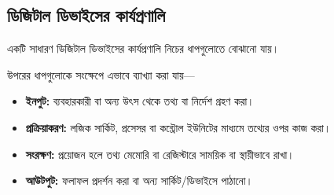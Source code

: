 \subsection{ডিজিটাল ডিভাইসের কার্যপ্রণালি}

একটি সাধারণ ডিজিটাল ডিভাইসের কার্যপ্রণালি নিচের ধাপগুলোতে বোঝানো যায়।

\begin{center}
\begin{chThreeDiagram}
\end{chThreeDiagram}
\end{center}

\smallskip

উপরের ধাপগুলোকে সংক্ষেপে এভাবে ব্যাখ্যা করা যায়—

\begin{itemize}[label={{\bulletfont\textbullet}}, leftmargin=*, nosep]
    \item \textbf{ইনপুট:} ব্যবহারকারী বা অন্য উৎস থেকে তথ্য বা নির্দেশ গ্রহণ করা।
    \item \textbf{প্রক্রিয়াকরণ:} লজিক সার্কিট, প্রসেসর বা কন্ট্রোল ইউনিটের মাধ্যমে তথ্যের ওপর কাজ করা।
    \item \textbf{সংরক্ষণ:} প্রয়োজন হলে তথ্য মেমোরি বা রেজিস্টারে সাময়িক বা স্থায়ীভাবে রাখা।
    \item \textbf{আউটপুট:} ফলাফল প্রদর্শন করা বা অন্য সার্কিট/ডিভাইসে পাঠানো।
\end{itemize}

